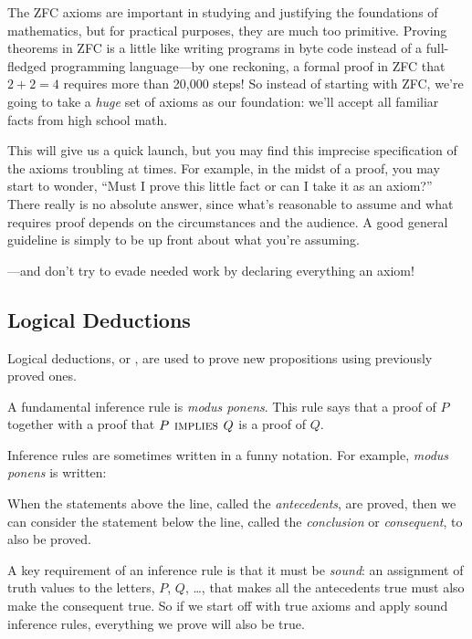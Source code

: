 The ZFC axioms are important in studying and justifying the foundations of
mathematics, but for practical purposes, they are much too primitive.
Proving theorems in ZFC is a little like writing programs in byte code
instead of a full-fledged programming language---by one reckoning, a
formal proof in ZFC that $2 + 2 = 4$ requires more than 20,000 steps!  So
instead of starting with ZFC, we're going to take a \textit{huge} set of
axioms as our foundation: we'll accept all familiar facts from high school
math.

This will give us a quick launch, but you may find this imprecise
specification of the axioms troubling at times.  For example, in the
midst of a proof, you may start to wonder, ``Must I prove this little
fact or can I take it as an axiom?''  There really is no absolute
answer, since what's reasonable to assume and what requires proof
depends on the circumstances and the audience.  A good general
guideline is simply to be up front about what you're assuming.
\begin{editingnotes} ---and
don't try to evade needed work by declaring everything an axiom!
\end{editingnotes}

\subsection{Logical Deductions }\label{logical_deductions_subsec}

Logical deductions, or , are used to prove new
propositions using previously proved ones.

A fundamental inference rule is \emph{modus ponens}.%
  This rule says that
a proof of $P$ together with a proof that $P \mathbin{\mathrm{\textsc{\,implies\,}}} Q$ is a proof of
$Q$.

Inference rules are sometimes written in a funny notation.  For example,
\emph{modus ponens} is written:
\begin{rul*}
\end{rul*}

When the statements above the line, called the \emph{antecedents}, are
proved, then we can consider the statement below the line, called the
\emph{conclusion} or \emph{consequent}, to also be proved.

A key requirement of an inference rule is that it must be
\emph{sound}: an assignment of truth values to the letters, $P$, $Q$,
\dots, that makes all the antecedents true must also make the
consequent true.  So if we start off with true axioms and apply sound
inference rules, everything we prove will also be true.

